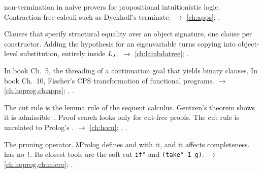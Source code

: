 \begin{glossarylist}
  non-termination in naive provers for propositional intuitionistic logic. Contraction-free calculi such as
  Dyckhoff's terminate. $\rightarrow$ \cref{ch:apps}; .
\item[Copy clauses] Clauses  that specify structural equality over an object signature, one clause per
  constructor. Adding the hypothesis  for an eigenvariable  turns copying into object-level
  substitution, entirely inside $L_\lambda$. $\rightarrow$ \cref{ch:lambdatree}; .
\item[CPS (continuation-passing style)] In book Ch.~5, the threading of a continuation goal that yields binary
  clauses. In book Ch.~10, Fischer's CPS transformation of functional programs.
  $\rightarrow$ \cref{ch:hoprog,ch:apps}; , .
\item[Cut rule, cut elimination] The cut rule is the lemma rule of the sequent calculus. Gentzen's theorem shows it
  is admissible~\cite{Gentzen1935}. Proof search looks only for cut-free proofs. The cut rule is unrelated to
  Prolog's \lp{!}. $\rightarrow$ \cref{ch:horn}; , .
\item[Cut, Prolog's \texttt{!}] The pruning operator. λProlog defines  and  with it, and it affects
  completeness. \micro{} has no \texttt{!}. Its closest tools are the soft cut \texttt{if°} and
  \texttt{(take° 1 g)}. $\rightarrow$ \cref{ch:hoprog,ch:micro}; .
\end{glossarylist}

